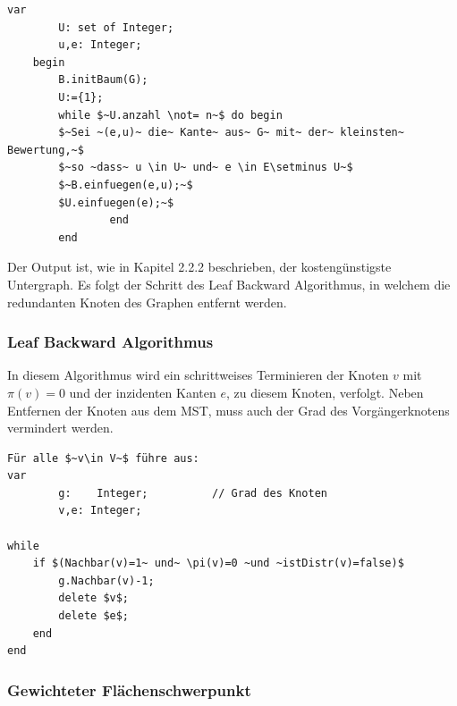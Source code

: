 \vspace{0.5cm}

\begin{lstlisting}[label=Prim-Algorithmus, caption=: Prim-Algorithmus, mathescape] 
	var
		U: set of Integer;
		u,e: Integer;
	begin
		B.initBaum(G);
		U:={1};
		while $~U.anzahl \not= n~$ do begin
		$~Sei ~(e,u)~ die~ Kante~ aus~ G~ mit~ der~ kleinsten~ Bewertung,~$ 
	    $~so ~dass~ u \in U~ und~ e \in E\setminus U~$ 
	    $~B.einfuegen(e,u);~$ 
	    $U.einfuegen(e);~$ 
 				end 
 		end
\end{lstlisting}

\vspace{0.5cm}

Der Output ist, wie in Kapitel 2.2.2 beschrieben, der kostengünstigste Untergraph.
Es folgt der Schritt des Leaf Backward Algorithmus, in welchem die redundanten Knoten des Graphen entfernt werden.

\vspace{1cm}



\subsubsection{Leaf Backward Algorithmus}
\label{sec:2methoden}

\vspace{0.5cm}

In diesem Algorithmus wird ein schrittweises Terminieren der Knoten $v$ mit $\pi(v)=0$ und der inzidenten Kanten $e$, zu diesem Knoten, verfolgt.
Neben  Entfernen der Knoten aus dem MST, muss auch der Grad des Vorgängerknotens vermindert werden. 

\vspace{0.4cm}

\begin{lstlisting}[label=Leaf-Backward-Algorithmus, caption=: Leaf-Backward-Algorithmus, mathescape]
Für alle $~v\in V~$ führe aus:
var
		g:    Integer; 			// Grad des Knoten
		v,e: Integer;	
	
while
	if $(Nachbar(v)=1~ und~ \pi(v)=0 ~und ~istDistr(v)=false)$
		g.Nachbar(v)-1;
		delete $v$;
		delete $e$;
	end 
end
\end{lstlisting}

\vspace{0.5cm}


\subsubsection{Gewichteter Flächenschwerpunkt}
\label{sec:2methoden}



